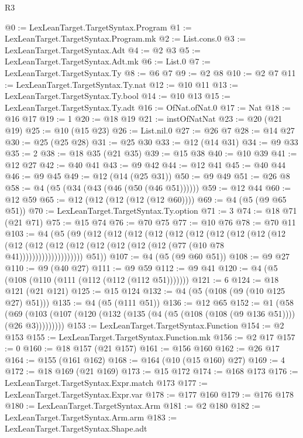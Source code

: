 \begin{lexlean}{R3}
\begin{coremodule}
@0 := LexLeanTarget.TargetSyntax.Program
@1 := LexLeanTarget.TargetSyntax.Program.mk
@2 := List.cons.{0}
@3 := LexLeanTarget.TargetSyntax.Adt
@4 := @2 @3
@5 := LexLeanTarget.TargetSyntax.Adt.mk
@6 := List.{0}
@7 := LexLeanTarget.TargetSyntax.Ty
@8 := @6 @7
@9 := @2 @8
@10 := @2 @7
@11 := LexLeanTarget.TargetSyntax.Ty.nat
@12 := @10 @11
@13 := LexLeanTarget.TargetSyntax.Ty.bool
@14 := @10 @13
@15 := LexLeanTarget.TargetSyntax.Ty.adt
@16 := OfNat.ofNat.{0}
@17 := Nat
@18 := @16 @17
@19 := 1
@20 := @18 @19
@21 := instOfNatNat
@23 := @20 (@21 @19)
@25 := @10 (@15 @23)
@26 := List.nil.{0}
@27 := @26 @7
@28 := @14 @27
@30 := @25 (@25 @28)
@31 := @25 @30
@33 := @12 (@14 @31)
@34 := @9 @33
@35 := 2
@38 := @18 @35 (@21 @35)
@39 := @15 @38
@40 := @10 @39
@41 := @12 @27
@42 := @40 @41
@43 := @9 @42
@44 := @12 @41
@45 := @40 @44
@46 := @9 @45
@49 := @12 (@14 (@25 @31))
@50 := @9 @49
@51 := @26 @8
@58 := @4 (@5 (@34 (@43 (@46 (@50 (@46 @51))))))
@59 := @12 @44
@60 := @12 @59
@65 := @12 (@12 (@12 (@12 (@12 @60))))
@69 := @4 (@5 (@9 @65 @51))
@70 := LexLeanTarget.TargetSyntax.Ty.option
@71 := 3
@74 := @18 @71 (@21 @71)
@75 := @15 @74
@76 := @70 @75
@77 := @10 @76
@78 := @70 @11
@103 := @4
    (@5
      (@9
        (@12
          (@12
            (@12
              (@12
                (@12
                  (@12
                    (@12
                      (@12
                        (@12
                          (@12
                            (@12
                              (@12
                                (@12 (@12 (@12 (@12 (@12 (@12 (@77 (@10 @78 @41))))))))))))))))))))
        @51))
@107 := @4 (@5 (@9 @60 @51))
@108 := @9 @27
@110 := @9 (@40 @27)
@111 := @9 @59
@112 := @9 @41
@120 := @4 (@5 (@108 (@110 (@111 (@112 (@112 (@112 @51)))))))
@121 := 6
@124 := @18 @121 (@21 @121)
@125 := @15 @124
@132 := @4 (@5 (@108 (@9 (@10 @125 @27) @51)))
@135 := @4 (@5 (@111 @51))
@136 := @12 @65
@152 := @1
    (@58 (@69 (@103 (@107 (@120 (@132 (@135 (@4 (@5 (@108 (@108 (@9 @136 @51)))) (@26 @3)))))))))
@153 := LexLeanTarget.TargetSyntax.Function
@154 := @2 @153
@155 := LexLeanTarget.TargetSyntax.Function.mk
@156 := @2 @17
@157 := 0
@160 := @18 @157 (@21 @157)
@161 := @156 @160
@162 := @26 @17
@164 := @155 (@161 @162)
@168 := @164 (@10 (@15 @160) @27)
@169 := 4
@172 := @18 @169 (@21 @169)
@173 := @15 @172
@174 := @168 @173
@176 := LexLeanTarget.TargetSyntax.Expr.match @173
@177 := LexLeanTarget.TargetSyntax.Expr.var
@178 := @177 @160
@179 := @176 @178
@180 := LexLeanTarget.TargetSyntax.Arm
@181 := @2 @180
@182 := LexLeanTarget.TargetSyntax.Arm.arm
@183 := LexLeanTarget.TargetSyntax.Shape.adt

\end{coremodule}
\end{lexlean}
